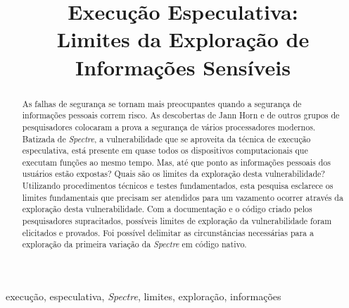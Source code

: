 \documentclass[conference]{IEEEtran}
\begin{document}

\title{Execução Especulativa:\\
Limites da Exploração de Informações Sensíveis}

\author{
}

\maketitle

\begin{abstract}
As falhas de segurança se tornam mais preocupantes quando a segurança de informações pessoais correm risco. As descobertas de Jann Horn e de outros grupos de pesquisadores colocaram a prova a segurança de vários processadores modernos. Batizada de \emph{Spectre}, a vulnerabilidade que se aproveita da técnica de execução especulativa, está presente em quase todos os dispositivos computacionais que executam funções ao mesmo tempo. Mas, até que ponto as informações pessoais dos usuários estão expostas? Quais são os limites da exploração desta vulnerabilidade? Utilizando procedimentos técnicos e testes fundamentados, esta pesquisa esclarece os limites fundamentais que precisam ser atendidos para um vazamento ocorrer através da exploração desta vulnerabilidade. Com a documentação e o código criado pelos pesquisadores supracitados, possíveis limites de exploração da vulnerabilidade foram elicitados e provados. Foi possível delimitar as circunstâncias necessárias para a exploração da primeira variação da \emph{Spectre} em código nativo.
\end{abstract}

\begin{IEEEkeywords}
execução, especulativa, \emph{Spectre}, limites, exploração, informações
\end{IEEEkeywords}

\end{document}
